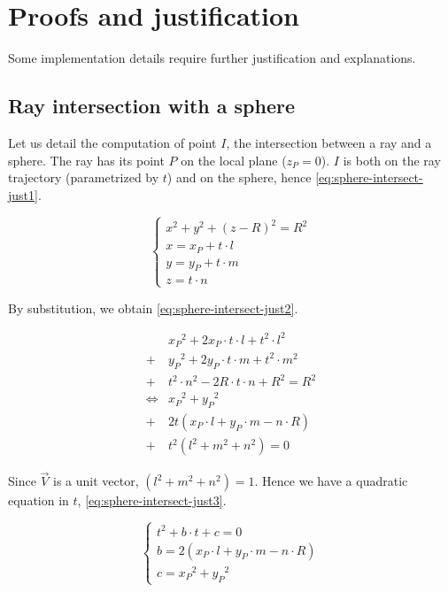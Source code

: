 \section{Proofs and justification}
Some implementation details require further justification and explanations.

\subsection{Ray intersection with a sphere}
Let us detail the computation of point $I$, the intersection between
a ray and a sphere. The ray has its point $P$ on the local plane
($z_P = 0$).
$I$ is both on the ray trajectory (parametrized by $t$) and on the sphere,
hence \cref{eq:sphere-intersect-just1}.

\begin{equation} \label{eq:sphere-intersect-just1}
\begin{cases}
x^2 + y^2 + (z - R)^2 = R^2 \\
x = x_P + t \cdot l \\
y = y_P + t \cdot m \\
z = t \cdot n
\end{cases}
\end{equation}

By substitution, we obtain \cref{eq:sphere-intersect-just2}.

\begin{equation} \label{eq:sphere-intersect-just2}
\begin{split}
&{x_P}^2 + 2 x_P \cdot t \cdot l + t^2
\cdot l^2 \\
+ &{y_P}^2 + 2 y_P \cdot t \cdot m + t^2
\cdot m^2 \\
+ &t^2 \cdot n^2 - 2 R \cdot t \cdot n + R^2
= R^2 \\
\iff &{x_P}^2 + {y_P}^2 \\
+ & 2 t (x_P \cdot l + y_P \cdot m - n \cdot R) \\
+ & t^2 (l^2 + m^2 + n^2) = 0
\end{split} \end{equation}

Since $\overrightarrow{V}$ is a unit vector, $(l^2 + m^2 + n^2) = 1$.
Hence we have a quadratic equation in $t$, \cref{eq:sphere-intersect-just3}.

\begin{equation} \label{eq:sphere-intersect-just3} \begin{cases}
t^2 + b \cdot t + c = 0 \\
b = 2 (x_P \cdot l + y_P \cdot m - n \cdot R) \\
c = {x_P}^2 + {y_P}^2
\end{cases} \end{equation}

